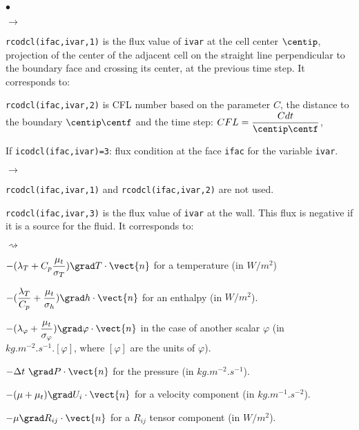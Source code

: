 {{{\begin{list}{$\bullet$}{}
\begin{list}{$\rightarrow$}{}
\item \texttt{rcodcl(ifac,ivar,1)} is the flux value of \texttt{ivar} at the cell center $\centip$,
      projection of the center of the adjacent cell on the straight line
      perpendicular to the boundary face and crossing its center,
      at the previous time step.
      It corresponds to:
\item \texttt{rcodcl(ifac,ivar,2)} is CFL number based on the parameter $C$,
      the distance to the boundary $\centip \centf$ and the time step:  
      $CFL = \dfrac{C dt }{\centip \centf}$,

\end{list}

\item If \texttt{icodcl(ifac,ivar)=3}: flux condition at the face \texttt{ifac}
      for the variable \texttt{ivar}.

\begin{list}{$\rightarrow$}{}
\item \texttt{rcodcl(ifac,ivar,1)} and \texttt{rcodcl(ifac,ivar,2)} are not used.

\item \texttt{rcodcl(ifac,ivar,3)} is the flux value of \texttt{ivar} at the
      wall. This flux is negative if it is a source for the fluid. It corresponds to:
\begin{list}{$\rightsquigarrow$}{}
\item
$\displaystyle -(\lambda_T+C_p\frac{\mu_t}{\sigma_T})\grad T\cdot\vect{n}$ for a temperature (in $W/m^2$)

$\displaystyle -(\frac{\lambda_T}{C_p}+\frac{\mu_t}{\sigma_h})\grad h\cdot\vect{n}$
     for an enthalpy (in $W/m^2$).

$\displaystyle -(\lambda_\varphi+\frac{\mu_t}{\sigma_\varphi})\grad\varphi\cdot\vect{n}$ in the case of another scalar $\varphi$ (in $kg.m^{-2}.s^{-1}.[\varphi]$, where $[\varphi]$ are the units of $\varphi$).

\item $-\Delta t\ \grad P\cdot\vect{n}$ for the pressure (in $kg.m^{-2}.s^{-1}$).

\item $-(\mu+\mu_t)\grad U_i\cdot\vect{n}$ for a velocity component (in $kg.m^{-1}.s^{-2}$).

\item $-\mu\grad R_{ij}\cdot\vect{n}$ for a $R_{ij}$ tensor component (in $W/m^2$).
\end{list}

\end{list}


\end{list}}}}
